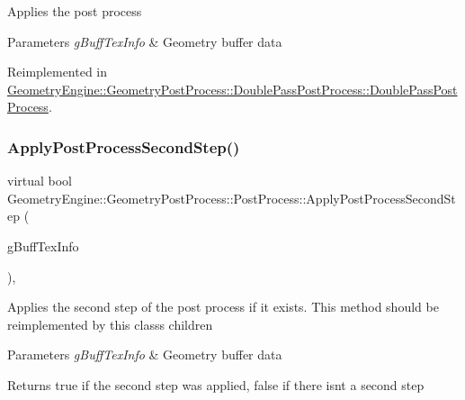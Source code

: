 Applies the post process 
\begin{DoxyParams}{Parameters}
{\em g\+Buff\+Tex\+Info} & Geometry buffer data \\
\hline
\end{DoxyParams}


Reimplemented in \mbox{\hyperlink{class_geometry_engine_1_1_geometry_post_process_1_1_double_pass_post_process_1_1_double_pass_post_process_a9d2674bc5b237ed2e494d1c88f63d29e}{Geometry\+Engine\+::\+Geometry\+Post\+Process\+::\+Double\+Pass\+Post\+Process\+::\+Double\+Pass\+Post\+Process}}.

\mbox{\label{class_geometry_engine_1_1_geometry_post_process_1_1_post_process_a3657f263948ecee70314c859e15412e1}} 
\subsubsection{\texorpdfstring{ApplyPostProcessSecondStep()}{ApplyPostProcessSecondStep()}}
{\footnotesize\ttfamily virtual bool Geometry\+Engine\+::\+Geometry\+Post\+Process\+::\+Post\+Process\+::\+Apply\+Post\+Process\+Second\+Step (\begin{DoxyParamCaption}\item[{const \mbox{\hyperlink{class_geometry_engine_1_1_g_buffer_texture_info}{G\+Buffer\+Texture\+Info}} \&}]{g\+Buff\+Tex\+Info }\end{DoxyParamCaption})\hspace{0.3cm}{\ttfamily [inline]}, {\ttfamily [virtual]}}

Applies the second step of the post process if it exists. This method should be reimplemented by this class\textquotesingle{}s children 
\begin{DoxyParams}{Parameters}
{\em g\+Buff\+Tex\+Info} & Geometry buffer data \\
\hline
\end{DoxyParams}
\begin{DoxyReturn}{Returns}
true if the second step was applied, false if there isn\textquotesingle{}t a second step 
\end{DoxyReturn}


